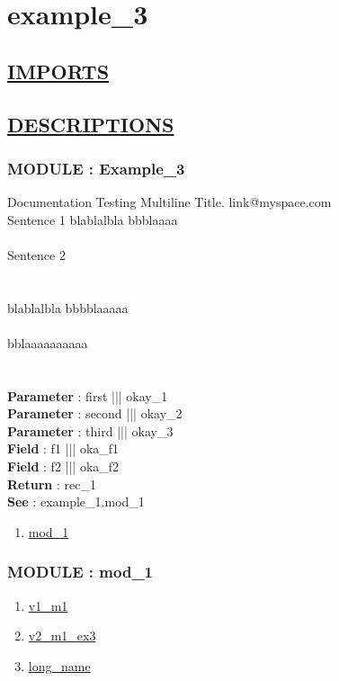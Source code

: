\chapter*{example\_3}

\section*{\underline{IMPORTS}}

\section*{\underline{DESCRIPTIONS}}
\subsection*{MODULE : Example\_3}
\hypertarget{ecldoc:example_3_Example_3}{}
Documentation Testing Multiline Title. link@myspace.com  \\
 Sentence 1 blablalbla bbblaaaa  \\
 \\
 Sentence 2  \\
 \\
 \\
 blablalbla                    bbbblaaaaa \\
 \\
 bblaaaaaaaaaa \\
  \\
 \\
\textbf{Parameter} : first ||| okay\_1 \\
\textbf{Parameter} : second ||| okay\_2 \\
\textbf{Parameter} : third ||| okay\_3 \\
\textbf{Field} : f1 ||| oka\_f1 \\
\textbf{Field} : f2 ||| oka\_f2 \\
\textbf{Return} : rec\_1 \\
\textbf{See} : example\_1.mod\_1 \\
\begin{enumerate}
\item \hyperlink{ecldoc:example_3_Example_3.mod_1}{mod\_1}
\end{enumerate}
\subsection*{MODULE : mod\_1}
\hypertarget{ecldoc:example_3_Example_3.mod_1}{}
\begin{enumerate}
\item \hyperlink{ecldoc:example_3_example_3.mod_1.v1_m1}{v1\_m1}
\item \hyperlink{ecldoc:example_3_example_3.mod_1.v2_m1_ex3}{v2\_m1\_ex3}
\item \hyperlink{ecldoc:example_3_example_3.mod_1.long_name}{long\_name}
\end{enumerate}
